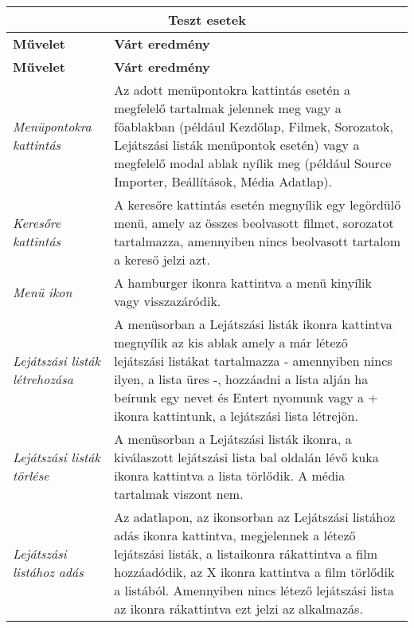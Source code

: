 \begin{center}
	\begin{longtable}{ | p{} | p{} | }

		\hline
		\multicolumn{2}{|c|}{\textbf{Teszt esetek}}
		\\ \hline

		\textbf{Művelet} & \textbf{Várt eredmény}
		\\ \hline \hline
		\endfirsthead %

		\hline
		\textbf{Művelet} & \textbf{Várt eredmény}
		\\ \hline \hline
		\endhead %

		\hline
		\endfoot %

		\endlastfoot %

		\emph{Menüpontokra kattintás}
		& Az adott menüpontokra kattintás esetén a megfelelő tartalmak jelennek meg vagy a főablakban (például Kezdőlap, Filmek, Sorozatok, Lejátszási listák menüpontok esetén) vagy a megfelelő modal ablak nyílik meg (például Source Importer, Beállítások, Média Adatlap).
		\\ \hline

		\emph{Keresőre kattintás}
		& A keresőre kattintás esetén megnyílik egy legördülő menü, amely az összes beolvasott filmet, sorozatot tartalmazza, amennyiben nincs beolvasott tartalom a kereső jelzi azt.
		\\ \hline

        \emph{Menü ikon}
		& A hamburger ikonra kattintva a menü kinyílik vagy visszazáródik.
		\\ \hline

        \emph{Lejátszási listák létrehozása}
		& A menüsorban a Lejátszási listák ikonra kattintva megnyílik az kis ablak amely a már létező lejátszási listákat tartalmazza - amennyiben nincs ilyen, a lista üres -, hozzáadni a lista alján ha beírunk egy nevet és Entert nyomunk vagy a + ikonra kattintunk, a lejátszási lista létrejön.
		\\ \hline

        \emph{Lejátszási listák törlése}
		& A menüsorban a Lejátszási listák ikonra, a kiválaszott lejátszási lista bal oldalán lévő kuka ikonra kattintva a lista törlődik. A média tartalmak viszont nem.
		\\ \hline

        \emph{Lejátszási listához adás}
		& Az adatlapon, az ikonsorban az Lejátszási listához adás ikonra kattintva, megjelennek a létező lejátszási listák, a listaikonra rákattintva a film hozzáadódik, az X ikonra kattintva a film törlődik a listából. Amennyiben nincs létező lejátszási lista az ikonra rákattintva ezt jelzi az alkalmazás.
		\\ \hline


\end{longtable}
\end{center}
